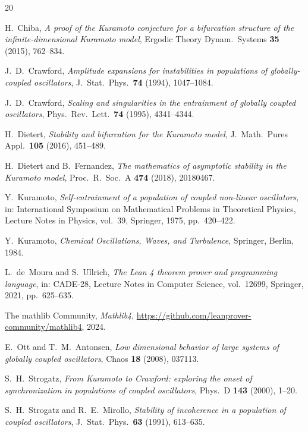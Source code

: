 \documentclass[11pt,a4paper]{article}
\theoremstyle{definition}
\begin{document}
\begin{thebibliography}{20}

H.~Chiba,
\emph{A proof of the Kuramoto conjecture for a bifurcation structure of the infinite-dimensional Kuramoto model},
Ergodic Theory Dynam.\ Systems \textbf{35} (2015), 762--834.

J.~D.~Crawford,
\emph{Amplitude expansions for instabilities in populations of globally-coupled oscillators},
J.~Stat.\ Phys.\ \textbf{74} (1994), 1047--1084.

J.~D.~Crawford,
\emph{Scaling and singularities in the entrainment of globally coupled oscillators},
Phys.\ Rev.\ Lett.\ \textbf{74} (1995), 4341--4344.

H.~Dietert,
\emph{Stability and bifurcation for the Kuramoto model},
J.~Math.\ Pures Appl.\ \textbf{105} (2016), 451--489.

H.~Dietert and B.~Fernandez,
\emph{The mathematics of asymptotic stability in the Kuramoto model},
Proc.\ R.\ Soc.\ A \textbf{474} (2018), 20180467.

Y.~Kuramoto,
\emph{Self-entrainment of a population of coupled non-linear oscillators},
in: International Symposium on Mathematical Problems in Theoretical Physics, Lecture Notes in Physics, vol.~39, Springer, 1975, pp.~420--422.

Y.~Kuramoto,
\emph{Chemical Oscillations, Waves, and Turbulence},
Springer, Berlin, 1984.

L.~de~Moura and S.~Ullrich,
\emph{The Lean 4 theorem prover and programming language},
in: CADE-28, Lecture Notes in Computer Science, vol.~12699, Springer, 2021, pp.~625--635.

The mathlib Community,
\emph{Mathlib4},
\url{https://github.com/leanprover-community/mathlib4}, 2024.

E.~Ott and T.~M.~Antonsen,
\emph{Low dimensional behavior of large systems of globally coupled oscillators},
Chaos \textbf{18} (2008), 037113.

S.~H.~Strogatz,
\emph{From Kuramoto to Crawford: exploring the onset of synchronization in populations of coupled oscillators},
Phys.\ D \textbf{143} (2000), 1--20.

S.~H.~Strogatz and R.~E.~Mirollo,
\emph{Stability of incoherence in a population of coupled oscillators},
J.~Stat.\ Phys.\ \textbf{63} (1991), 613--635.

\end{thebibliography}
\end{document}
